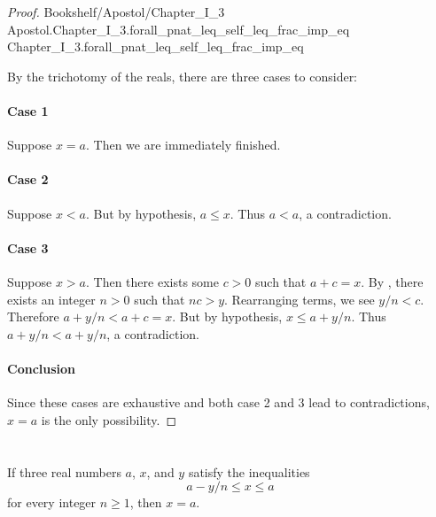 \documentclass{article}
\newcommand{\link}[1]{\lean{../..}
  {Bookshelf/Apostol/Chapter\_I\_3}
  {Apostol.Chapter\_I\_3.#1}
  {Chapter\_I\_3.#1}
}
\begin{document}
\begin{proof}

  \link{forall\_pnat\_leq\_self\_leq\_frac\_imp\_eq}

  \divider

  By the trichotomy of the reals, there are three cases to consider:

  \paragraph{Case 1}%

    Suppose $x = a$.
    Then we are immediately finished.

  \paragraph{Case 2}%

    Suppose $x < a$.
    But by hypothesis, $a \leq x$.
    Thus $a < a$, a contradiction.

  \paragraph{Case 3}%

    Suppose $x > a$.
    Then there exists some $c > 0$ such that $a + c = x$.
    By , there exists an integer $n > 0$ such that
      $nc > y$.
    Rearranging terms, we see $y / n < c$.
    Therefore $a + y / n < a + c = x$.
    But by hypothesis, $x \leq a + y / n$.
    Thus $a + y / n < a + y / n$, a contradiction.

  \paragraph{Conclusion}%

    Since these cases are exhaustive and both case 2 and 3 lead to
      contradictions, $x = a$ is the only possibility.

\end{proof}

\section*{}%
%

If three real numbers $a$, $x$, and $y$ satisfy the inequalities
  $$a - y / n \leq x \leq a$$ for every integer $n \geq 1$, then $x = a$.
\end{document}
